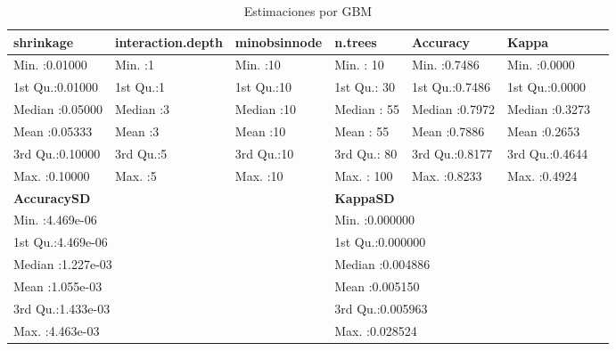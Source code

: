 \begin{table}[htbp]
\centering
\caption{Estimaciones por GBM}
\label{tab:gbm}
\begin{tabular}{lllllll}
\toprule
\textbf{shrinkage} & \textbf{interaction.depth} & \textbf{minobsinnode} & \textbf{n.trees} & \textbf{Accuracy} & \textbf{Kappa} \\
\midrule
Min. :0.01000 & Min. :1 & Min. :10 & Min. : 10 & Min. :0.7486 & Min. :0.0000 \\
1st Qu.:0.01000 & 1st Qu.:1 & 1st Qu.:10 & 1st Qu.: 30 & 1st Qu.:0.7486 & 1st Qu.:0.0000 \\
Median :0.05000 & Median :3 & Median :10 & Median : 55 & Median :0.7972 & Median :0.3273 \\
Mean :0.05333 & Mean :3 & Mean :10 & Mean : 55 & Mean :0.7886 & Mean :0.2653 \\
3rd Qu.:0.10000 & 3rd Qu.:5 & 3rd Qu.:10 & 3rd Qu.: 80 & 3rd Qu.:0.8177 & 3rd Qu.:0.4644 \\
Max. :0.10000 & Max. :5 & Max. :10 & Max. : 100 & Max. :0.8233 & Max. :0.4924 \\
\midrule
\multicolumn{3}{l}{\textbf{AccuracySD}} & \multicolumn{3}{l}{\textbf{KappaSD}} \\
\midrule
\multicolumn{3}{l}{Min. :4.469e-06} & \multicolumn{3}{l}{Min. :0.000000} \\
\multicolumn{3}{l}{1st Qu.:4.469e-06} & \multicolumn{3}{l}{1st Qu.:0.000000} \\
\multicolumn{3}{l}{Median :1.227e-03} & \multicolumn{3}{l}{Median :0.004886} \\
\multicolumn{3}{l}{Mean :1.055e-03} & \multicolumn{3}{l}{Mean :0.005150} \\
\multicolumn{3}{l}{3rd Qu.:1.433e-03} & \multicolumn{3}{l}{3rd Qu.:0.005963} \\
\multicolumn{3}{l}{Max. :4.463e-03} & \multicolumn{3}{l}{Max. :0.028524} \\
\bottomrule
\end{tabular}
\end{table}